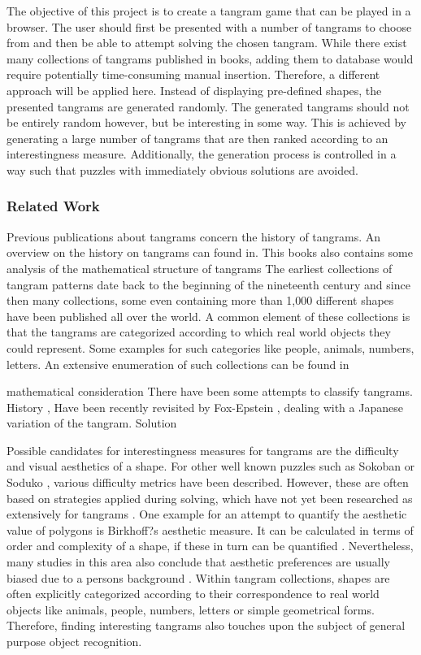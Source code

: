 The objective of this project is to create a tangram game that can be played in a browser. The user should first be presented with a number of tangrams to choose from and then be able to attempt solving the chosen tangram. 
While there exist many collections of tangrams published in books, adding them to database would require potentially time-consuming manual insertion. Therefore, a different approach will be applied here. Instead of displaying pre-defined shapes, the presented tangrams are generated randomly. The generated tangrams should not be entirely random however, but be interesting in some way. This is achieved by generating a large number of tangrams that are then ranked according to an interestingness measure. Additionally, the generation process is controlled in a way such that puzzles with immediately obvious solutions are avoided. 

\subsubsection*{Related Work}

Previous publications about tangrams concern the history of tangrams. 
An overview on the history on tangrams can found in. This books also contains some analysis of the mathematical structure of tangrams 
The earliest collections of tangram patterns date back to the beginning of the nineteenth century \cite{elffers76} and since then many collections, some even containing more than 1,000 different shapes have been published all over the world. A common element of these collections is that the tangrams are categorized according to which real world objects they could represent. Some examples for such categories 
like people, animals, numbers, letters. An extensive enumeration of such collections can be found in \cite{slocum03}

mathematical consideration
There have been some attempts to classify tangrams. 
History , \cite{wang42} 
Have been recently revisited by Fox-Epstein \cite{foxepstein14}, dealing with a Japanese variation of the tangram.
Solution \cite{deutsch72} \cite{oflazer93} \cite{kovalsky14}

Possible candidates for interestingness measures for tangrams are the difficulty and visual aesthetics of a shape. For other well known puzzles such as Sokoban \cite{jaruvsek10} or Soduko \cite{hunt07}, various difficulty metrics have been described. However, these are often based on strategies applied during solving, which have not yet been researched as extensively for tangrams \cite{baran07}. One example for an attempt to quantify the aesthetic value of polygons is Birkhoff?s aesthetic measure. It can be calculated in terms of order and complexity of a shape, if these in turn can be quantified \cite{filonik09}. Nevertheless, many studies in this area also conclude that aesthetic preferences are usually biased due to a persons background \cite{eberle14}. Within tangram collections, shapes are often explicitly categorized according to their correspondence to real world objects like animals, people, numbers, letters or simple geometrical forms. Therefore, finding interesting tangrams also touches upon the subject of general purpose object recognition. 

